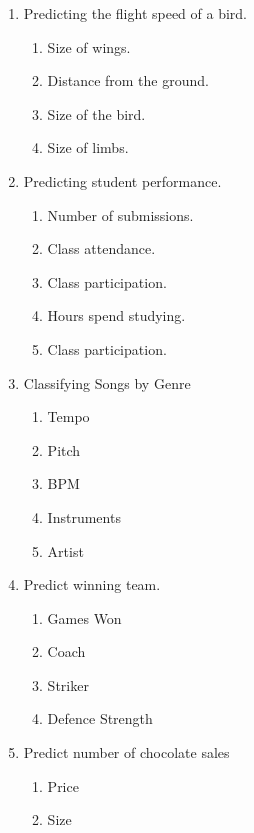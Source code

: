 \documentclass[10pt]{article}
\begin{document}
\begin{enumerate}
\begin{enumerate}
			\item Predicting the flight speed of a bird.
				\begin{enumerate}
					\item Size of wings.
					\item Distance from the ground.
					\item Size of the bird.
					\item Size of limbs.
				\end{enumerate}
			\item Predicting student performance.
				\begin{enumerate}
					\item Number of submissions.
					\item Class attendance.
					\item Class participation.
					\item Hours spend studying.
					\item Class participation.
				\end{enumerate}
			\item Classifying Songs by Genre
				\begin{enumerate}
					\item Tempo
					\item Pitch
					\item BPM
					\item Instruments
					\item Artist
				\end{enumerate}
			\item Predict winning team.
				\begin{enumerate}
					\item Games Won
					\item Coach
					\item Striker
					\item Defence Strength
				\end{enumerate}
			\item Predict number of chocolate sales
				\begin{enumerate}
					\item Price
					\item Size
				\end{enumerate}
		\end{enumerate}
	\end{enumerate}
	
	
	
\end{document}
